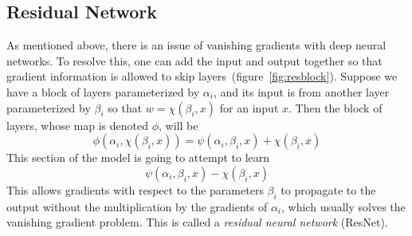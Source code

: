 \subsection{Residual Network}
As mentioned above, there is an issue of vanishing gradients with deep neural networks. To resolve this, one can add the input and output together so that gradient information is allowed to skip layers~\cite{he_deep_2015}(figure~\ref{fig:resblock}). Suppose we have a block of layers parameterized by $\alpha_i$, and its input is from another layer parameterized by $\beta_i$ so that $w=\chi(\beta_i,x)$ for an input $x$. Then the block of layers, whose map is denoted $\phi$, will be
\begin{equation}
	\phi(\alpha_i,\chi(\beta_i,x)) = \psi(\alpha_i,\beta_i,x)+\chi(\beta_i,x)
\end{equation}
This section of the model is going to attempt to learn
\begin{equation}
	\psi(\alpha_i,\beta_i,x)-\chi(\beta_i,x)
\end{equation}
This allows gradients with respect to the parameters $\beta_i$ to propagate to the output without the multiplication by the gradients of $\alpha_i$, which usually solves the vanishing gradient problem. This is called a \textit{residual neural network} (ResNet).

